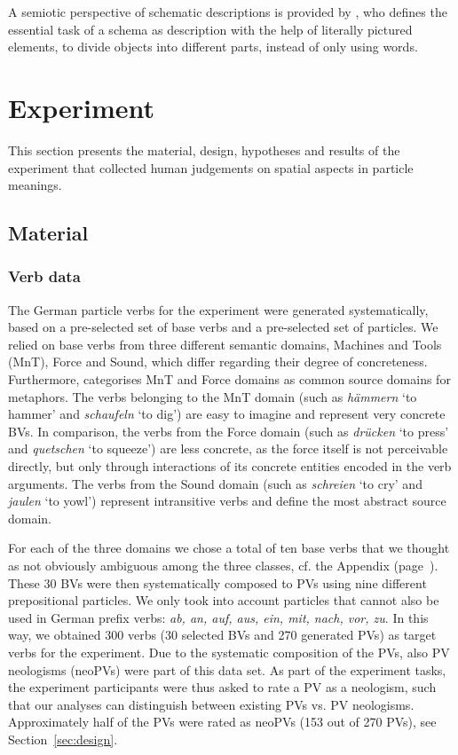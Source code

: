 \documentclass[output=paper]{langsci/langscibook}
\begin{document}
A semiotic perspective of schematic descriptions is provided by
\cite{Frutiger:87}, who defines the essential task of a schema as
description with the help of literally pictured elements, to divide
objects into different parts, instead of only using
words.

\section{Experiment}
\label{sec:exp}

This section presents the material, design, hypotheses and results of
the experiment that collected human judgements on spatial aspects in
particle meanings.

\subsection{Material}

\subsubsection{Verb data}
\label{sec:data}

The German particle verbs for the experiment were generated
systematically, based on a pre-selected set of base verbs and a
pre-selected set of particles. We relied on base verbs from three
different semantic domains, Machines and Tools (MnT),
Force and Sound, which differ regarding their degree
of concreteness. Furthermore, \cite{Koevecses:02} categorises
MnT and Force domains as common source domains for
metaphors. The verbs belonging to the MnT domain (such as
\textit{hämmern} `to hammer' and \textit{schaufeln} `to dig') are
easy to imagine and represent very concrete BVs. In comparison, the
verbs from the Force domain (such as \textit{drücken} `to
press' and \textit{quetschen} `to squeeze') are less concrete, as
the force itself is not perceivable directly, but only through
interactions of its concrete entities encoded in the verb
arguments. The verbs from the Sound domain (such as
\textit{schreien} `to cry' and \textit{jaulen} `to yowl')
represent intransitive verbs and define the most abstract source
domain.

For each of the three domains we chose a total of ten base verbs that
we thought as not obviously ambiguous among the three classes, cf. the
Appendix (page~\pageref{tab:bv-sd}). These 30 BVs were then systematically composed to PVs using
nine different prepositional particles. We only took into account
particles that cannot also be used in German prefix verbs: \textit{ab,
  an, auf, aus, ein, mit, nach, vor, zu}. In this way, we obtained 300
verbs (30 selected BVs and 270 generated PVs) as target verbs for the
experiment. Due to the systematic composition of the PVs, also PV
neologisms (neoPVs) were part of this data set. As part of the
experiment tasks, the experiment participants were thus asked to rate
a PV as a neologism, such that our analyses can distinguish between
existing PVs vs. PV neologisms. Approximately half of the PVs were
rated as neoPVs (153 out of 270 PVs), see Section~\ref{sec:design}.
\end{document}
